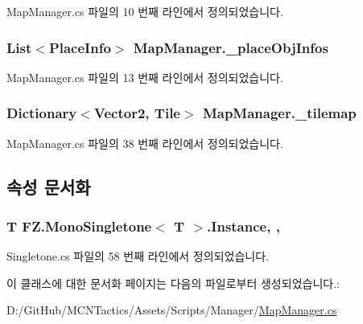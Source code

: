 Map\+Manager.\+cs 파일의 10 번째 라인에서 정의되었습니다.

\subsubsection[{\texorpdfstring{\+\_\+place\+Obj\+Infos}{_placeObjInfos}}]{\setlength{\rightskip}{0pt plus 5cm}List$<${\bf Place\+Info}$>$ Map\+Manager.\+\_\+place\+Obj\+Infos\hspace{0.3cm}{\ttfamily [private]}}\hypertarget{class_map_manager_ab581d2c754246f74999a0b744ba2b14f}{}\label{class_map_manager_ab581d2c754246f74999a0b744ba2b14f}


Map\+Manager.\+cs 파일의 13 번째 라인에서 정의되었습니다.

\subsubsection[{\texorpdfstring{\+\_\+tilemap}{_tilemap}}]{\setlength{\rightskip}{0pt plus 5cm}Dictionary$<$Vector2, {\bf Tile}$>$ Map\+Manager.\+\_\+tilemap\hspace{0.3cm}{\ttfamily [private]}}\hypertarget{class_map_manager_a58f7635d8e19795f3845a3f85e2b4ac3}{}\label{class_map_manager_a58f7635d8e19795f3845a3f85e2b4ac3}


Map\+Manager.\+cs 파일의 38 번째 라인에서 정의되었습니다.



\subsection{속성 문서화}
\subsubsection[{\texorpdfstring{Instance}{Instance}}]{\setlength{\rightskip}{0pt plus 5cm}T {\bf F\+Z.\+Mono\+Singletone}$<$ T $>$.Instance\hspace{0.3cm}{\ttfamily [static]}, {\ttfamily [get]}, {\ttfamily [inherited]}}\hypertarget{class_f_z_1_1_mono_singletone_a39e34129d25a9664576949259e7dfd5f}{}\label{class_f_z_1_1_mono_singletone_a39e34129d25a9664576949259e7dfd5f}


Singletone.\+cs 파일의 58 번째 라인에서 정의되었습니다.



이 클래스에 대한 문서화 페이지는 다음의 파일로부터 생성되었습니다.\+:\begin{DoxyCompactItemize}
\item 
D\+:/\+Git\+Hub/\+M\+C\+N\+Tactics/\+Assets/\+Scripts/\+Manager/\hyperlink{_map_manager_8cs}{Map\+Manager.\+cs}\end{DoxyCompactItemize}
